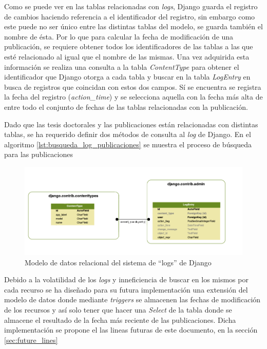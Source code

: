 Como se puede ver en las tablas relacionadas con \textit{logs}, Django guarda el registro de cambios haciendo referencia a el identificador del registro, sin embargo como este puede no ser único entre las distintas tablas del modelo, se guarda también el nombre de ésta. Por lo que para calcular la fecha de modificación de una publicación, se requiere obtener todos los identificadores de las tablas a las que esté relacionado al igual que el nombre de las mismas. Una vez adquirida esta información se realiza una consulta a la tabla \textit{ContentType} para obtener el identificador que Django otorga a cada tabla y buscar en la tabla \textit{LogEntry} en busca de registros que coincidan con estos dos campos. Sí se encuentra se registra la fecha del registro (\textit{action\_time}) y se selecciona aquella con la fecha más alta de entre todo el conjunto de fechas de las tablas relacionadas con la publicación.

Dado que las tesis doctorales y las publicaciones están relacionadas con distintas tablas, se ha requerido definir dos métodos de consulta al \textit{log} de Django. En el algoritmo \ref{lst:busqueda_log_publicaciones} se muestra el proceso de búsqueda para las publicaciones

\begin{figure}[!htbp]
	\centering
	\includegraphics[scale=0.45]{fig/dbmodel/django_log}
	\caption{Modelo de datos relacional del sistema de ``logs'' de Django}
	\label{fig:logsmodel}
\end{figure}



Debido a la volatilidad de los \textit{logs} y inneficiencia de buscar en los mismos por cada recurso se ha diseñado para su futura implementación una extensión del modelo de datos donde mediante \textit{triggers} se almacenen las fechas de modificación de los recursos  y así solo tener que hacer una \textit{Select} de la tabla donde se almacene el resultado de la fecha más reciente de las publicaciones.
Dicha implementación se propone el las lineas futuras de este documento, en la sección \ref{sec:future_lines}


